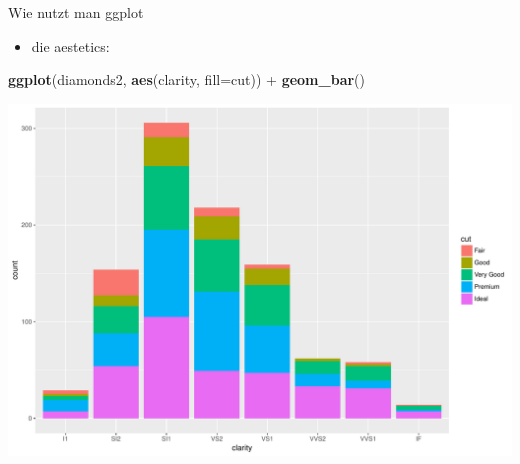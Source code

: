 \documentclass[ignorenonframetext,]{beamer}
\newenvironment{Shaded}{}{}
\newcommand{\KeywordTok}[1]{\textcolor[rgb]{0.00,0.44,0.13}{\textbf{{#1}}}}
\newcommand{\DataTypeTok}[1]{\textcolor[rgb]{0.56,0.13,0.00}{{#1}}}
\newcommand{\StringTok}[1]{\textcolor[rgb]{0.25,0.44,0.63}{{#1}}}
\newcommand{\NormalTok}[1]{{#1}}
\providecommand{\tightlist}{%
\setlength{\itemsep}{0pt}\setlength{\parskip}{0pt}}
\begin{document}
\begin{frame}[fragile]{Wie nutzt man ggplot}

\begin{itemize}
\tightlist
\item
  die aestetics:
\end{itemize}

\begin{Shaded}
\begin{Highlighting}[]
\KeywordTok{ggplot}\NormalTok{(diamonds2, }\KeywordTok{aes}\NormalTok{(clarity, }\DataTypeTok{fill=}\NormalTok{cut)) +}\StringTok{ }\KeywordTok{geom_bar}\NormalTok{()}
\end{Highlighting}
\end{Shaded}

\includegraphics{R_intern_files/figure-beamer/unnamed-chunk-250-1.pdf}

\end{frame}
\end{document}
